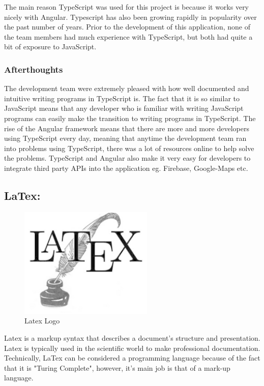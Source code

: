 \bigskip

The main reason TypeScript was used for this project is because it works very nicely with Angular. Typescript has also been growing rapidly in popularity over the past number of years. Prior to the development of this application, none of the team members had much experience with TypeScript, but both had quite a bit of exposure to JavaScript. 

\subsubsection{Afterthoughts}

The development team were extremely pleased with how well documented and intuitive writing programs in TypeScript is.  The fact that it is so similar to JavaScript means that any developer who is familiar with writing JavaScript programs can easily make the transition to writing programs in TypeScript. The rise of the Angular framework means that there are more and more developers using TypeScript every day, meaning that anytime the development team ran into problems using TypeScript, there was a lot of resources online to help solve the problems. TypeScript and Angular also make it very easy for developers to integrate third party APIs into the application eg. Firebase, Google-Maps etc.


\subsection{LaTex:}
\label{sec:TechnologyReviewLatex}

\begin{figure}[H]
    \centering
    \includegraphics[width=\textwidth, height=150pt]{img/LaTexLogo.PNG}
    \caption{Latex Logo}
    \label{fig:my_label}
\end{figure}


Latex is a markup syntax that describes a document's structure and presentation. Latex is typically used in the scientific world to make professional documentation. Technically, LaTex can be considered a programming language because of the fact that it is "Turing Complete"\cite{teller1994turing}, however, it's main job is that of a mark-up language.   

